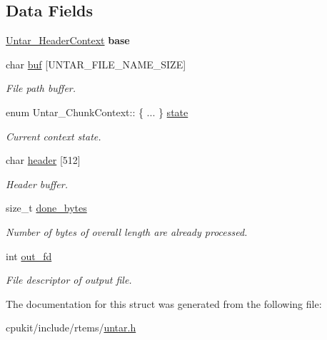 \subsection*{Data Fields}
\begin{DoxyCompactItemize}
\item 
\mbox{\label{structUntar__ChunkContext_ad82459b52639c6bd564874bc6d33284e}} 
\mbox{\hyperlink{structUntar__HeaderContext}{Untar\+\_\+\+Header\+Context}} {\bfseries base}
\item 
\mbox{\label{structUntar__ChunkContext_a7af40ec623ceb002e0aa0baa915a5a86}} 
char \mbox{\hyperlink{structUntar__ChunkContext_a7af40ec623ceb002e0aa0baa915a5a86}{buf}} \mbox{[}U\+N\+T\+A\+R\+\_\+\+F\+I\+L\+E\+\_\+\+N\+A\+M\+E\+\_\+\+S\+I\+ZE\mbox{]}
\begin{DoxyCompactList}\small\item\em File path buffer. \end{DoxyCompactList}\item 
\mbox{\label{structUntar__ChunkContext_a289119b60ac10e8666c592256649515b}} 
enum Untar\+\_\+\+Chunk\+Context\+:: \{ ... \}  \mbox{\hyperlink{structUntar__ChunkContext_a289119b60ac10e8666c592256649515b}{state}}
\begin{DoxyCompactList}\small\item\em Current context state. \end{DoxyCompactList}\item 
\mbox{\label{structUntar__ChunkContext_a60fde445382f9ed987679a0ad68e7263}} 
char \mbox{\hyperlink{structUntar__ChunkContext_a60fde445382f9ed987679a0ad68e7263}{header}} \mbox{[}512\mbox{]}
\begin{DoxyCompactList}\small\item\em Header buffer. \end{DoxyCompactList}\item 
\mbox{\label{structUntar__ChunkContext_a76b17ef90ca2b4adef1569c799eb8ab4}} 
size\+\_\+t \mbox{\hyperlink{structUntar__ChunkContext_a76b17ef90ca2b4adef1569c799eb8ab4}{done\+\_\+bytes}}
\begin{DoxyCompactList}\small\item\em Number of bytes of overall length are already processed. \end{DoxyCompactList}\item 
\mbox{\label{structUntar__ChunkContext_a3c42f64aaba029393225698a572f4471}} 
int \mbox{\hyperlink{structUntar__ChunkContext_a3c42f64aaba029393225698a572f4471}{out\+\_\+fd}}
\begin{DoxyCompactList}\small\item\em File descriptor of output file. \end{DoxyCompactList}\end{DoxyCompactItemize}


The documentation for this struct was generated from the following file\+:\begin{DoxyCompactItemize}
\item 
cpukit/include/rtems/\mbox{\hyperlink{untar_8h}{untar.\+h}}\end{DoxyCompactItemize}
